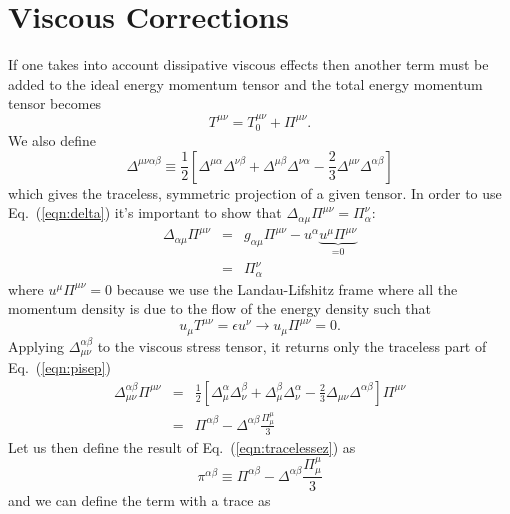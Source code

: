 \documentclass[aps,article]{revtex4}
\begin{document}
\section{Viscous Corrections}

If one takes into account dissipative viscous effects then another term must be added to the ideal energy momentum tensor and the total energy momentum tensor becomes 
\begin{equation}\label{eqn:tmunuvisc}
T^{\mu\nu}=T^{\mu\nu}_{0}+\Pi^{\mu\nu}.
\end{equation}
We also define
\begin{equation}
\Delta^{\mu\nu\alpha\beta}\equiv \frac{1}{2}\left[\Delta^{\mu\alpha}\Delta^{\nu\beta}+\Delta^{\mu\beta}\Delta^{\nu\alpha}-\frac{2}{3}\Delta^{\mu\nu}\Delta^{\alpha\beta}\right]\label{eqn:delta}
\end{equation}
which gives the traceless, symmetric projection of a given tensor.  In order to use Eq.\ (\ref{eqn:delta}) it's important to show that $\Delta_{\alpha\mu}\Pi^{\mu\nu}=\Pi^{\nu}_{\alpha}$:
\begin{eqnarray}
\Delta_{\alpha\mu}\Pi^{\mu\nu}&=&g_{\alpha\mu}\Pi^{\mu\nu}-u^{\alpha}\underbrace{u^{\mu}\Pi^{\mu\nu}}_\textrm{=0}\nonumber\\
&=&\Pi^{\nu}_{\alpha}\label{eqn:deltaonpi}
\end{eqnarray}
where $u^{\mu}\Pi^{\mu\nu}=0$ because we use the Landau-Lifshitz frame where all the momentum density is due to the flow of the energy density such that
\begin{equation}
u_{\mu}T^{\mu\nu}=\epsilon u^{\nu}\rightarrow u_{\mu}\Pi^{\mu\nu}=0.
\end{equation}
Applying $\Delta_{\mu\nu}^{\alpha\beta}$ to the viscous stress tensor, it returns only the traceless part of Eq.\ (\ref{eqn:pisep})
\begin{eqnarray}
\Delta^{\alpha\beta}_{\mu\nu}\Pi^{\mu\nu}&=&\frac{1}{2}\left[\Delta^{\alpha}_{\mu}\Delta^{\beta}_{\nu}+\Delta^{\beta}_{\mu}\Delta^{\alpha}_{\nu}-\frac{2}{3}\Delta_{\mu\nu}\Delta^{\alpha\beta}\right]\Pi^{\mu\nu}\nonumber\\
&=&\Pi^{\alpha\beta}-\Delta^{\alpha\beta}\frac{\Pi^{\mu}_{\mu}}{3}\label{eqn:tracelessez}
\end{eqnarray}
Let us then define the result of Eq.\ (\ref{eqn:tracelessez}) as
\begin{equation}
\pi^{\alpha\beta}\equiv \Pi^{\alpha\beta}-\Delta^{\alpha\beta}\frac{\Pi^{\mu}_{\mu}}{3}
\end{equation}
and we can define the term with a trace as 
\end{document}
